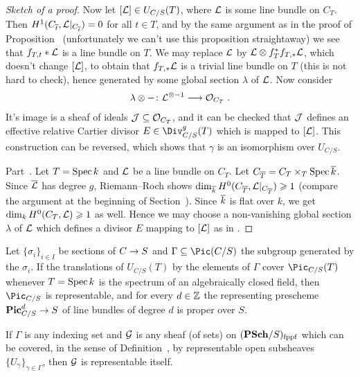 \documentclass[a4paper,parskip=half,numbers=enddot, DIV=12]{scrreprt}
\renewcommand{\geq}{\geqslant}
\begin{document}
\begin{proof}[Sketch of a proof]
	Now let $[\mathcal{L}]\in U_{C/S}(T)$, where $\mathcal{L}$ is some line bundle on $C_T$. Then $H^1(C_{\overline{t}},\mathcal{L}|_{C_{\overline{t}}})=0$ for all $t\in T$, and by the same argument as in the proof of Proposition~ (unfortunately we can't use this proposition straightaway) we see that $f_{T,t}*\mathcal{L}$ is a line bundle on $T$. We may replace $\mathcal{L}$ by $\mathcal{L}\otimes f_T^*f_{T,*}\mathcal{L}$, which doesn't change $[\mathcal{L}]$, to obtain that $f_{T,*}\mathcal{L}$ is a trivial line bundle on $T$ (this is not hard to check), hence generated by some global section $\lambda$ of $\mathcal{L}$. Now consider
	\begin{align*}
		\lambda\otimes -\colon \Ll^{\otimes -1}\morphism \Oo_{C_T}\;.
	\end{align*}
	It's image is a sheaf of ideals $\mathcal{J}\subseteq \mathcal{O}_{C_T}$, and it can be checked that $\mathcal{J}$ defines an effective relative Cartier divisor $E\in\Div_{C/S}^g(T)$ which is mapped to $[\mathcal{L}]$. This construction can be reversed, which shows that $\gamma$ is an isomorphism over $U_{C/S}$.
	
	Part~. Let $T=\operatorname{Spec} k$ and $\mathcal{L}$ be a line bundle on $C_T$. Let $C_{\overline{T}}=C_T\times_T\operatorname{Spec}\overline{k}$. Since $\overline{\mathcal{L}}$ has degree $g$, Riemann--Roch shows $\dim_{\ov{k}}H^0(C_{\ov{T}},\Ll|_{C_{\ov{T}}})\geq 1$ (compare the argument at the beginning of Section~). Since $\overline{k}$ is flat over $k$, we get $\dim_kH^0(C_T,\Ll)\geq 1$ as well. Hence we may choose a non-vanishing global section $\lambda$ of $\mathcal{L}$ which defines a divisor $E$ mapping to $[\mathcal{L}]$ as in .
\end{proof}
\begin{prop}
	\begin{alphanumerate}
		\item {}Let $\{\sigma_i\}_{i\in I}$ be sections of $C\morphism S$ and $\Gamma\subseteq \Pic(C/S)$ the subgroup generated by the $\sigma_i$. If the translations of $U_{C/S}(T)$ by the elements of $\Gamma$ cover $\Pic_{C/S}(T)$ whenever $T=\operatorname{Spec} k$ is the spectrum of an algebraically closed field, then $\Pic_{C/S}$ is representable, and for every $d\in \mathbb{Z}$ the representing prescheme $\PIC_{C/S}^d\morphism S$ of line bundles of degree $d$ is proper over $S$.
		\item If $\Gamma$ is any indexing set and $\mathcal{G}$ is any sheaf (of sets) on $(\cat{PSch}/S)_\fppf$ which can be covered, in the sense of Definition~, by representable open subsheaves $\{U_\gamma\}_{\gamma\in\Gamma}$, then $\mathcal{G}$ is representable itself.
	\end{alphanumerate}
\end{prop}
\end{document}
